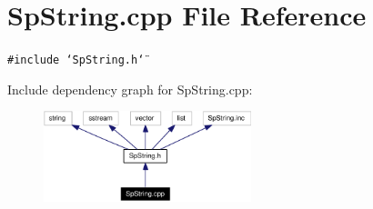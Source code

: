 \section{Sp\-String.cpp File Reference}
\label{SpString_8cpp}
{\tt \#include \char`\"{}Sp\-String.h\char`\"{}}\par


Include dependency graph for Sp\-String.cpp:\begin{figure}[H]
\begin{center}
\leavevmode
\includegraphics[width=171pt]{SpString_8cpp__incl}
\end{center}
\end{figure}
